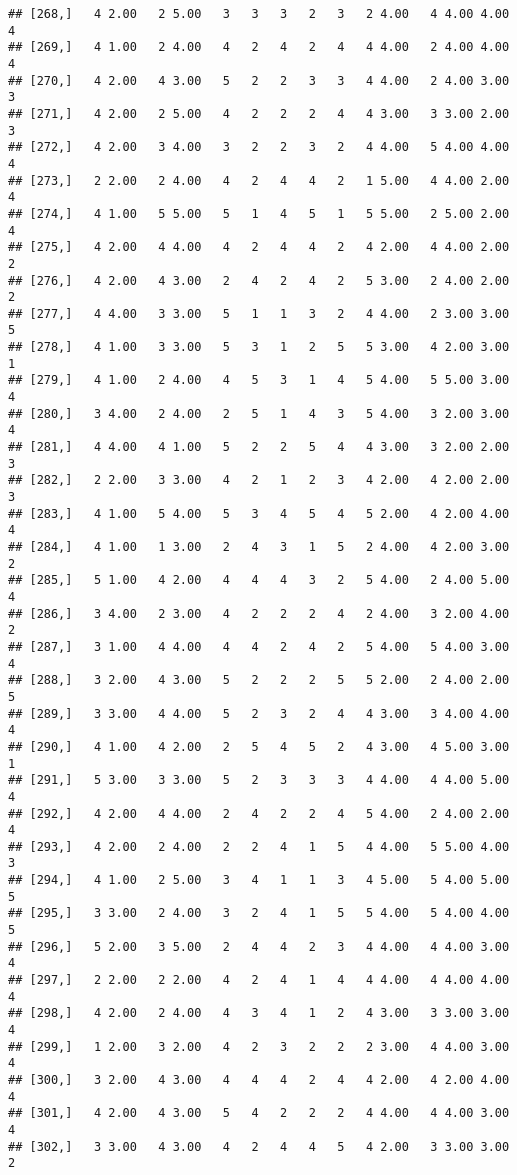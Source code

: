 \documentclass[]{article}
\begin{document}
\begin{verbatim}
## [268,]   4 2.00   2 5.00   3   3   3   2   3   2 4.00   4 4.00 4.00   4
## [269,]   4 1.00   2 4.00   4   2   4   2   4   4 4.00   2 4.00 4.00   4
## [270,]   4 2.00   4 3.00   5   2   2   3   3   4 4.00   2 4.00 3.00   3
## [271,]   4 2.00   2 5.00   4   2   2   2   4   4 3.00   3 3.00 2.00   3
## [272,]   4 2.00   3 4.00   3   2   2   3   2   4 4.00   5 4.00 4.00   4
## [273,]   2 2.00   2 4.00   4   2   4   4   2   1 5.00   4 4.00 2.00   4
## [274,]   4 1.00   5 5.00   5   1   4   5   1   5 5.00   2 5.00 2.00   4
## [275,]   4 2.00   4 4.00   4   2   4   4   2   4 2.00   4 4.00 2.00   2
## [276,]   4 2.00   4 3.00   2   4   2   4   2   5 3.00   2 4.00 2.00   2
## [277,]   4 4.00   3 3.00   5   1   1   3   2   4 4.00   2 3.00 3.00   5
## [278,]   4 1.00   3 3.00   5   3   1   2   5   5 3.00   4 2.00 3.00   1
## [279,]   4 1.00   2 4.00   4   5   3   1   4   5 4.00   5 5.00 3.00   4
## [280,]   3 4.00   2 4.00   2   5   1   4   3   5 4.00   3 2.00 3.00   4
## [281,]   4 4.00   4 1.00   5   2   2   5   4   4 3.00   3 2.00 2.00   3
## [282,]   2 2.00   3 3.00   4   2   1   2   3   4 2.00   4 2.00 2.00   3
## [283,]   4 1.00   5 4.00   5   3   4   5   4   5 2.00   4 2.00 4.00   4
## [284,]   4 1.00   1 3.00   2   4   3   1   5   2 4.00   4 2.00 3.00   2
## [285,]   5 1.00   4 2.00   4   4   4   3   2   5 4.00   2 4.00 5.00   4
## [286,]   3 4.00   2 3.00   4   2   2   2   4   2 4.00   3 2.00 4.00   2
## [287,]   3 1.00   4 4.00   4   4   2   4   2   5 4.00   5 4.00 3.00   4
## [288,]   3 2.00   4 3.00   5   2   2   2   5   5 2.00   2 4.00 2.00   5
## [289,]   3 3.00   4 4.00   5   2   3   2   4   4 3.00   3 4.00 4.00   4
## [290,]   4 1.00   4 2.00   2   5   4   5   2   4 3.00   4 5.00 3.00   1
## [291,]   5 3.00   3 3.00   5   2   3   3   3   4 4.00   4 4.00 5.00   4
## [292,]   4 2.00   4 4.00   2   4   2   2   4   5 4.00   2 4.00 2.00   4
## [293,]   4 2.00   2 4.00   2   2   4   1   5   4 4.00   5 5.00 4.00   3
## [294,]   4 1.00   2 5.00   3   4   1   1   3   4 5.00   5 4.00 5.00   5
## [295,]   3 3.00   2 4.00   3   2   4   1   5   5 4.00   5 4.00 4.00   5
## [296,]   5 2.00   3 5.00   2   4   4   2   3   4 4.00   4 4.00 3.00   4
## [297,]   2 2.00   2 2.00   4   2   4   1   4   4 4.00   4 4.00 4.00   4
## [298,]   4 2.00   2 4.00   4   3   4   1   2   4 3.00   3 3.00 3.00   4
## [299,]   1 2.00   3 2.00   4   2   3   2   2   2 3.00   4 4.00 3.00   4
## [300,]   3 2.00   4 3.00   4   4   4   2   4   4 2.00   4 2.00 4.00   4
## [301,]   4 2.00   4 3.00   5   4   2   2   2   4 4.00   4 4.00 3.00   4
## [302,]   3 3.00   4 3.00   4   2   4   4   5   4 2.00   3 3.00 3.00   2

\end{verbatim}
\end{document}
